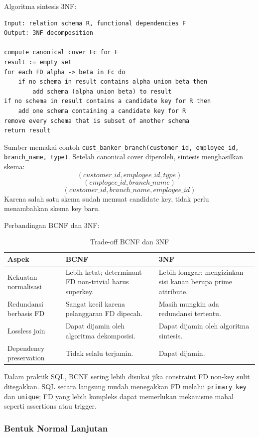Algoritma sintesis 3NF:
\begin{lstlisting}[caption={Pseudocode sintesis 3NF}, label={lst:3nf-synthesis}]
Input: relation schema R, functional dependencies F
Output: 3NF decomposition

compute canonical cover Fc for F
result := empty set
for each FD alpha -> beta in Fc do
    if no schema in result contains alpha union beta then
        add schema (alpha union beta) to result
if no schema in result contains a candidate key for R then
    add one schema containing a candidate key for R
remove every schema that is subset of another schema
return result
\end{lstlisting}

Sumber memakai contoh \texttt{cust\_banker\_branch(customer\_id, employee\_id, branch\_name, type)}. Setelah canonical cover diperoleh, sintesis menghasilkan skema:
\[
    (customer\_id, employee\_id, type)
\]
\[
    (employee\_id, branch\_name)
\]
\[
    (customer\_id, branch\_name, employee\_id)
\]
Karena salah satu skema sudah memuat candidate key, tidak perlu menambahkan skema key baru.

Perbandingan BCNF dan 3NF:
\begin{table}[H]
\centering
\begin{tabularx}{\textwidth}{|L{0.22\textwidth}|X|X|}
\hline
\textbf{Aspek} & \textbf{BCNF} & \textbf{3NF} \\
\hline
Kekuatan normalisasi & Lebih ketat; determinant FD non-trivial harus superkey. & Lebih longgar; mengizinkan sisi kanan berupa prime attribute. \\
\hline
Redundansi berbasis FD & Sangat kecil karena pelanggaran FD dipecah. & Masih mungkin ada redundansi tertentu. \\
\hline
Lossless join & Dapat dijamin oleh algoritma dekomposisi. & Dapat dijamin oleh algoritma sintesis. \\
\hline
Dependency preservation & Tidak selalu terjamin. & Dapat dijamin. \\
\hline
\end{tabularx}
\caption{Trade-off BCNF dan 3NF}
\label{tab:bcnf-3nf}
\end{table}

Dalam praktik SQL, BCNF sering lebih disukai jika constraint FD non-key sulit ditegakkan. SQL secara langsung mudah menegakkan FD melalui \texttt{primary key} dan \texttt{unique}; FD yang lebih kompleks dapat memerlukan mekanisme mahal seperti assertions atau trigger.

\subsubsection{Bentuk Normal Lanjutan}

